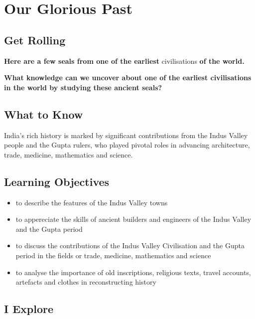 \chapter{Our Glorious Past}
\section{Get Rolling}
\textbf{Here are a few seals from one of the earliest} civilisations \textbf{of the world.}
\vspace{0.1in}
\par
\textbf{What knowledge can we uncover about one of the earliest civilisations in the world by studying these ancient seals?}
\section{What to Know}
India's rich history is marked by significant contributions from the Indus Valley people and the Gupta rulers, who played pivotal roles in advancing architecture, trade, medicine, mathematics and science.
\section{\textbf{Learning Objectives}}
\begin{itemize}
    \item to describe the features of the Indus Valley towns
    \item to appereciate the skills of ancient builders and engineers of the Indus Valley and the Gupta period
    \item to discuss the contributions of the Indus Valley Civilisation and the Gupta period in the fields or trade, medicine, mathematics and science
    \item to analyse the importance of old inscriptions, religious texts, travel accounts, artefacts and clothes in reconstructing history
\end{itemize}
\section{I Explore}
